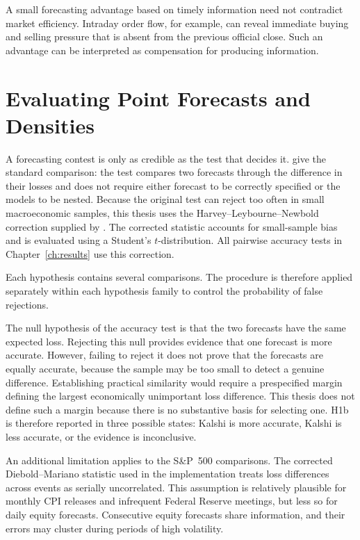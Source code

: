 \documentclass[12pt,a4paper]{report}
\begin{document}
A small forecasting advantage based on timely information need not contradict
market efficiency. Intraday order flow, for example, can reveal immediate
buying and selling pressure that is absent from the previous official close.
Such an advantage can be interpreted as compensation for producing information.

\section{Evaluating Point Forecasts and Densities}
\label{sec:lit-evaluation}

A forecasting contest is only as credible as the test that decides it.
\textcite{diebold1995} give the standard comparison: the test compares two
forecasts through the difference in their losses and does not require either
forecast to be correctly specified or the models to be nested. Because the
original test can reject too often in small macroeconomic samples, this thesis
uses the Harvey--Leybourne--Newbold correction supplied by
\textcite{harvey1997}. The corrected statistic accounts for small-sample bias
and is evaluated using a Student's \(t\)-distribution. All pairwise accuracy
tests in Chapter~\ref{ch:results} use this correction.

Each hypothesis contains several comparisons. The \textcite{holm1979}
procedure is therefore applied separately within each hypothesis family to
control the probability of false rejections.

The null hypothesis of the accuracy test is that the two forecasts have the same expected loss. Rejecting this null provides evidence that one forecast is more accurate. However, failing to reject it does not prove that the forecasts are equally accurate, because the sample may be too small to detect a genuine difference. Establishing practical similarity would require a prespecified margin defining the largest economically unimportant loss difference. This thesis does not define such a margin because there is no substantive basis for selecting one. H1b is therefore reported in three possible states: Kalshi is more accurate, Kalshi is less accurate, or the evidence is inconclusive.

An additional limitation applies to the S\&P~500 comparisons. The corrected
Diebold--Mariano statistic used in the implementation treats loss differences
across events as serially uncorrelated. This assumption is relatively plausible
for monthly CPI releases and infrequent Federal Reserve meetings, but less so
for daily equity forecasts. Consecutive equity forecasts share information, and
their errors may cluster during periods of high volatility.
\end{document}
